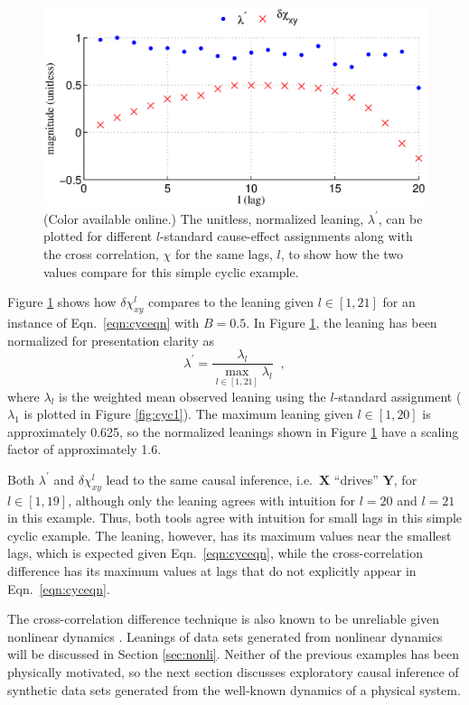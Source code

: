 \documentclass[twocolumn,aps,pre,groupedaddress]{revtex4-1}
\begin{document}
\begin{figure}[ht]
\includegraphics[scale=0.40]{SimpleCyclicexample_difflags.eps}
\caption{(Color available online.) The unitless, normalized leaning, $\lambda^\prime$, can be plotted for different $l$-standard cause-effect assignments along with the cross correlation, $\chi$ for the same lags, $l$, to show how the two values compare for this simple cyclic example.}
\label{fig:cyc2}
\end{figure}
Figure \ref{fig:cyc2} shows how $\delta\chi_{xy}^l$ compares to the leaning given $l\in[1,21]$ for an instance of Eqn.\ \ref{eqn:cyceqn} with $B=0.5$.  In Figure \ref{fig:cyc2}, the leaning has been normalized for presentation clarity as
\begin{equation}
\lambda^\prime = \frac{\lambda_l}{\max_{l\in[1,21]} \lambda_l}\;\;,
\end{equation}
where $\lambda_l$ is the weighted mean observed leaning using the $l$-standard assignment ($\lambda_1$ is plotted in Figure \ref{fig:cyc1}).  The maximum leaning given $l\in[1,20]$ is approximately 0.625, so the normalized leanings shown in Figure \ref{fig:cyc2} have a scaling factor of approximately 1.6.  

Both $\lambda^\prime$ and $\delta\chi_{xy}^l$ lead to the same causal inference, i.e.\ $\mathbf{X}$ ``drives'' $\mathbf{Y}$, for $l\in[1,19]$, although only the leaning agrees with intuition for $l=20$ and $l=21$ in this example.  Thus, both tools agree with intuition for small lags in this simple cyclic example.  The leaning, however, has its maximum values near the smallest lags, which is expected given Eqn.\ \ref{eqn:cyceqn}, while the cross-correlation difference has its maximum values at lags that do not explicitly appear in Eqn.\ \ref{eqn:cyceqn}.  

The cross-correlation difference technique is also known to be unreliable given nonlinear dynamics \cite{Rogosa1980}.  Leanings of data sets generated from nonlinear dynamics will be discussed in Section \ref{sec:nonli}.  Neither of the previous examples has been physically motivated, so the next section discusses exploratory causal inference of synthetic data sets generated from the well-known dynamics of a physical system.  
\end{document}
